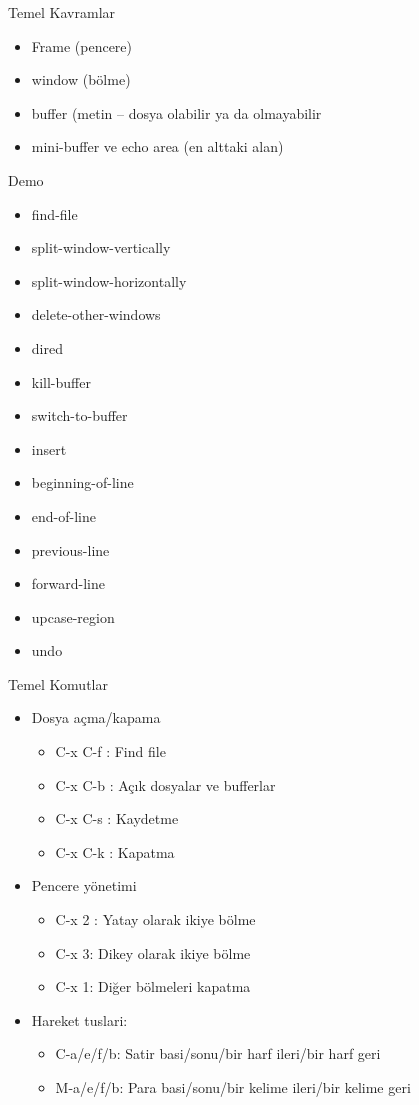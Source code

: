 \documentclass[presentation]{beamer}
\begin{document}
\begin{frame}[label=sec-6]{Temel Kavramlar}
\begin{itemize}
\item Frame (pencere)
\item window (bölme)
\item buffer (metin -- dosya olabilir ya da olmayabilir
\item mini-buffer ve echo area (en alttaki alan)
\end{itemize}
\end{frame}

\begin{frame}[label=sec-7]{Demo}
\begin{itemize}
\item find-file
\item split-window-vertically
\item split-window-horizontally
\item delete-other-windows
\item dired
\item kill-buffer
\item switch-to-buffer
\item insert
\item beginning-of-line
\item end-of-line
\item previous-line
\item forward-line
\item upcase-region
\item undo
\end{itemize}
\end{frame}

\begin{frame}[label=sec-8]{Temel Komutlar}
\begin{itemize}
\item Dosya açma/kapama
\begin{itemize}
\item C-x C-f : Find file
\item C-x C-b : Açık dosyalar ve bufferlar
\item C-x C-s : Kaydetme
\item C-x C-k : Kapatma
\end{itemize}

\item Pencere yönetimi
\begin{itemize}
\item C-x 2 : Yatay olarak ikiye bölme
\item C-x 3:  Dikey olarak ikiye bölme
\item C-x 1:  Diğer bölmeleri kapatma
\end{itemize}

\item Hareket tuslari:
\begin{itemize}
\item C-a/e/f/b: Satir basi/sonu/bir harf ileri/bir harf geri
\item M-a/e/f/b: Para basi/sonu/bir kelime ileri/bir kelime geri
\end{itemize}
\end{itemize}
\end{frame}
\end{document}
